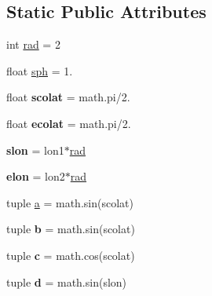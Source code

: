 \subsection*{Static Public Attributes}
\begin{DoxyCompactItemize}
\item 
int \hyperlink{classdistaz_1_1distaz_ae75c2ff534e098418237addb7d243b15}{rad} = 2
\item 
float \hyperlink{classdistaz_1_1distaz_abe7e7f55263b7cfdd1658bad101a5ae3}{sph} = 1.
\item 
\hypertarget{classdistaz_1_1distaz_a5b0dc828a5f6c001965a6ccf1b401a85}{}float {\bfseries scolat} = math.\+pi/2.\label{classdistaz_1_1distaz_a5b0dc828a5f6c001965a6ccf1b401a85}

\item 
\hypertarget{classdistaz_1_1distaz_a0aa8e03fe03c8e824ceaa07427f63c37}{}float {\bfseries ecolat} = math.\+pi/2.\label{classdistaz_1_1distaz_a0aa8e03fe03c8e824ceaa07427f63c37}

\item 
\hypertarget{classdistaz_1_1distaz_ac64490728eabb4c132dd2aab055ab2e1}{}{\bfseries slon} = lon1$\ast$\hyperlink{classdistaz_1_1distaz_ae75c2ff534e098418237addb7d243b15}{rad}\label{classdistaz_1_1distaz_ac64490728eabb4c132dd2aab055ab2e1}

\item 
\hypertarget{classdistaz_1_1distaz_a0444a4dea5413c6f8e3e03d59984ed5e}{}{\bfseries elon} = lon2$\ast$\hyperlink{classdistaz_1_1distaz_ae75c2ff534e098418237addb7d243b15}{rad}\label{classdistaz_1_1distaz_a0444a4dea5413c6f8e3e03d59984ed5e}

\item 
tuple \hyperlink{classdistaz_1_1distaz_adb0db47f4fc7ad23fe6b38ef41ede80d}{a} = math.\+sin(scolat)
\item 
\hypertarget{classdistaz_1_1distaz_ae6d7025ff0ea58d2054fd44941004866}{}tuple {\bfseries b} = math.\+sin(scolat)\label{classdistaz_1_1distaz_ae6d7025ff0ea58d2054fd44941004866}

\item 
\hypertarget{classdistaz_1_1distaz_a0f87137b0d34c8d6a8e7b95bf75b9aac}{}tuple {\bfseries c} = math.\+cos(scolat)\label{classdistaz_1_1distaz_a0f87137b0d34c8d6a8e7b95bf75b9aac}

\item 
\hypertarget{classdistaz_1_1distaz_a5e5dff502aa641274417f400d29aa5f9}{}tuple {\bfseries d} = math.\+sin(slon)\label{classdistaz_1_1distaz_a5e5dff502aa641274417f400d29aa5f9}


\end{DoxyCompactItemize}

